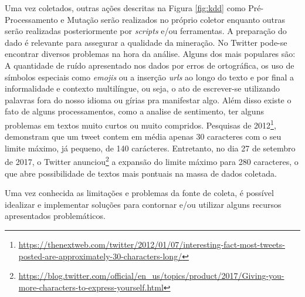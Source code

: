 Uma vez coletados, outras ações descritas na Figura \ref{fig:kdd} como Pré-Processamento e Mutação serão realizados no próprio coletor enquanto outras serão realizadas posteriormente por \textit{scripts} e/ou ferramentas. A preparação do dado é relevante para assegurar a qualidade da mineração. No Twitter pode-se encontrar diversos problemas na hora da análise. Alguns dos mais populares são: A quantidade de ruído apresentado nos dados por erros de ortográfica, os uso de símbolos especiais como \textit{emojis} ou a inserção \textit{urls} ao longo do texto e por final a informalidade e contexto multilíngue, ou seja, o ato de escrever-se utilizando palavras fora do nosso idioma ou gírias pra manifestar algo. Além disso existe o fato de alguns processamentos, como a analise de sentimento, ter alguns problemas em textos muito curtos ou muito compridos. Pesquisas de 2012\footnote{\url{https://thenextweb.com/twitter/2012/01/07/interesting-fact-most-tweets-posted-are-approximately-30-characters-long/}}, demonstram que um tweet contem em média apenas 30 caracteres com o seu limite máximo, já pequeno, de 140 carácteres. \cite[9-11]{silva2016analise} Entretanto, no dia 27 de setembro de 2017, o Twitter anunciou\footnote{\url{https://blog.twitter.com/official/en_us/topics/product/2017/Giving-you-more-characters-to-express-yourself.html}} a expansão do limite máximo para 280 caracteres, o que abre possibilidade de textos mais pontuais na massa de dados coletada.

Uma vez conhecida as limitações e problemas da fonte de coleta, é possível idealizar e implementar soluções para contornar e/ou utilizar alguns recursos apresentados problemáticos.
